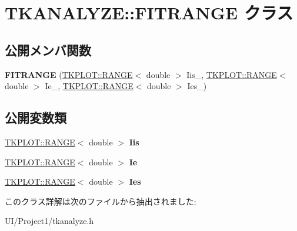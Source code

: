 \hypertarget{class_t_k_a_n_a_l_y_z_e_1_1_f_i_t_r_a_n_g_e}{}\section{T\+K\+A\+N\+A\+L\+Y\+ZE\+:\+:F\+I\+T\+R\+A\+N\+GE クラス}
\label{class_t_k_a_n_a_l_y_z_e_1_1_f_i_t_r_a_n_g_e}
\subsection*{公開メンバ関数}
\begin{DoxyCompactItemize}
\item 
\mbox{\label{class_t_k_a_n_a_l_y_z_e_1_1_f_i_t_r_a_n_g_e_a5c329b0c3f0c0326809c71c460d7cee8}} 
{\bfseries F\+I\+T\+R\+A\+N\+GE} (\hyperlink{class_t_k_p_l_o_t_1_1_r_a_n_g_e}{T\+K\+P\+L\+O\+T\+::\+R\+A\+N\+GE}$<$ double $>$ Iis\+\_\+, \hyperlink{class_t_k_p_l_o_t_1_1_r_a_n_g_e}{T\+K\+P\+L\+O\+T\+::\+R\+A\+N\+GE}$<$ double $>$ Ie\+\_\+, \hyperlink{class_t_k_p_l_o_t_1_1_r_a_n_g_e}{T\+K\+P\+L\+O\+T\+::\+R\+A\+N\+GE}$<$ double $>$ Ies\+\_\+)
\end{DoxyCompactItemize}
\subsection*{公開変数類}
\begin{DoxyCompactItemize}
\item 
\mbox{\label{class_t_k_a_n_a_l_y_z_e_1_1_f_i_t_r_a_n_g_e_ab11e12d473ea08ccf5d5fd46e6cd8e75}} 
\hyperlink{class_t_k_p_l_o_t_1_1_r_a_n_g_e}{T\+K\+P\+L\+O\+T\+::\+R\+A\+N\+GE}$<$ double $>$ {\bfseries Iis}
\item 
\mbox{\label{class_t_k_a_n_a_l_y_z_e_1_1_f_i_t_r_a_n_g_e_ad5e58e58eb386f890c9fab2b6cc47849}} 
\hyperlink{class_t_k_p_l_o_t_1_1_r_a_n_g_e}{T\+K\+P\+L\+O\+T\+::\+R\+A\+N\+GE}$<$ double $>$ {\bfseries Ie}
\item 
\mbox{\label{class_t_k_a_n_a_l_y_z_e_1_1_f_i_t_r_a_n_g_e_afee8e472d8fbb46d3112b0b6ba0f2edd}} 
\hyperlink{class_t_k_p_l_o_t_1_1_r_a_n_g_e}{T\+K\+P\+L\+O\+T\+::\+R\+A\+N\+GE}$<$ double $>$ {\bfseries Ies}
\end{DoxyCompactItemize}


このクラス詳解は次のファイルから抽出されました\+:\begin{DoxyCompactItemize}
\item 
U\+I/\+Project1/tkanalyze.\+h\end{DoxyCompactItemize}
